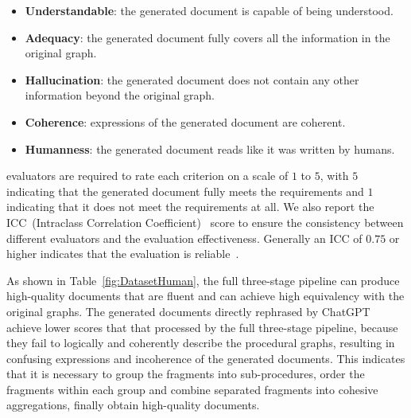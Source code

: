 \begin{itemize}
    \item \textbf{Understandable}: the generated document is capable of being understood. 
    \item \textbf{Adequacy}: the generated document fully covers all the information in the original graph. 
    \item \textbf{Hallucination}: the generated document does not contain any other information beyond the original graph. 
    \item \textbf{Coherence}: expressions of the generated document are coherent. 
    \item \textbf{Humanness}: the generated document reads like it was written by humans. 
\end{itemize}

\noindent
evaluators are required to rate each criterion on a scale of $1$ to $5$, with $5$ indicating that the generated document fully meets the requirements and $1$ indicating that it does not meet the requirements at all. 
We also report the ICC~(Intraclass Correlation Coefficient)~\cite{shrout1979intraclass} score to ensure the consistency between different evaluators and the evaluation effectiveness. Generally an ICC of $0.75$ or higher indicates that the evaluation is reliable~\cite{koo2016guideline}. 

As shown in Table~\ref{fig:DatasetHuman}, 
the full three-stage pipeline can produce high-quality documents that are fluent and can achieve high equivalency with the original graphs. The generated documents directly rephrased by ChatGPT achieve lower scores that that processed by the full three-stage pipeline, because they fail to logically and coherently describe the procedural graphs, resulting in confusing expressions and incoherence of the generated documents. 
This indicates that it is necessary to group the fragments into sub-procedures, order the fragments within each group and combine separated fragments into cohesive aggregations, finally obtain high-quality documents. 

